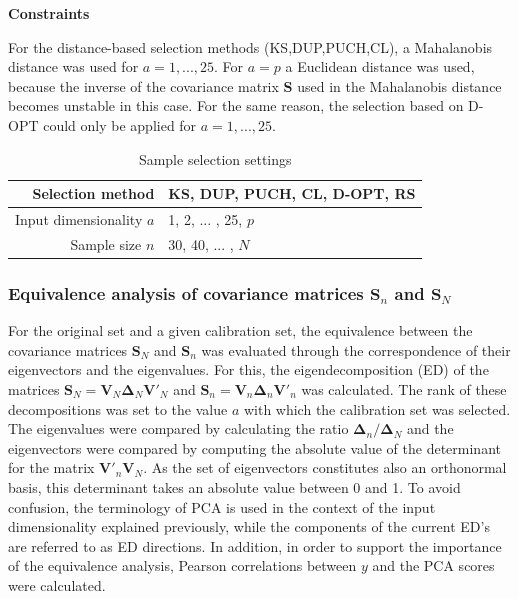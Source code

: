 \documentclass[journal=ancham,manuscript=article]{achemso}
\begin{document}
\textbf{Constraints}

For the distance-based selection methods (KS,DUP,PUCH,CL), a Mahalanobis distance was used for $a=1,...,25$.  For $a=p$ a Euclidean distance was used, because the inverse of the covariance matrix $\mathbf{S}$ used in the Mahalanobis distance becomes unstable in this case. For the same reason, the selection based on D-OPT could only be applied for $a=1,...,25$. 

\begin{table}[t]
\centering
\begin{tabular}{|r|l|} 
\hline
Selection method & KS, DUP, PUCH, CL, D-OPT, RS\\
\hline
Input dimensionality $a$ & 1, 2, ... , 25, $p$ \\
\hline
Sample size $n$ & 30, 40, ... , $N$ \\
\hline

\end{tabular}
\caption{Sample selection settings}
\label{tab_samplesel_settings_exhaustive_search}
\end{table}

\subsubsection{Equivalence analysis of covariance matrices $\mathbf{S}_n$ and $\mathbf{S}_N$}

For the original set and a given calibration set, the equivalence between the covariance matrices $\mathbf{S}_N$ and $\mathbf{S}_n$ was evaluated through the correspondence of their eigenvectors and the eigenvalues. For this, the eigendecomposition (ED) of the matrices $\mathbf{S}_N = \mathbf{V}_N \mathbf{\Delta}_N \mathbf{V}'_N$ and $\mathbf{S}_n = \mathbf{V}_n \mathbf{\Delta}_n \mathbf{V}'_n$ was calculated. The rank of these decompositions was set to the value $a$ with which the calibration set was selected. The eigenvalues were compared by calculating the ratio  $\mathbf{\Delta}_n/\mathbf{\Delta}_N$ and the eigenvectors were compared by computing the absolute value of the determinant for the matrix $\mathbf{V}'_n\mathbf{V}_N$. As the set of eigenvectors constitutes also an orthonormal basis, this determinant takes an absolute value between 0 and 1. To avoid confusion, the terminology of PCA is used in the context of the input dimensionality explained previously, while the components of the current ED's are referred to as ED directions. 
In addition, in order to support the importance of the equivalence analysis, Pearson correlations between $y$ and the PCA scores were calculated.
\end{document}

